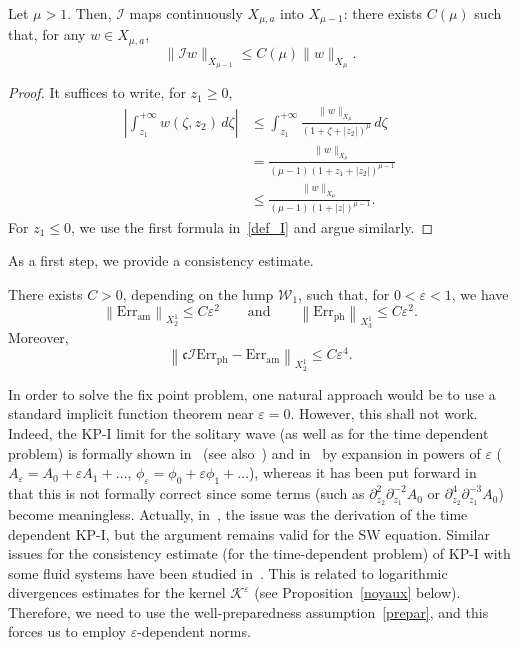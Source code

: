 \documentclass[AHL,Unicode,longabstracts,published]{cedram}
\newcommand*\p{\partial}
\newcommand{\amm}{\mathrm{am}}
\newcommand{\phl}{\mathrm{ph}}
\newcommand{\Err}{\mathrm{Err}}
\newcommand*\BI{\mathcal{I}}
\newcommand*\BK{\mathcal{K}}
\newcommand*\BW{\mathcal{W}}
\newcommand*\cs{{\mathfrak c}}
\newcommand*\ii{\infty}
\newcommand*\gs{\geqslant }
\newcommand*\ls{\leqslant }
\newcommand*\e{\varepsilon}
\begin{document}
\begin{prop}\label{primit}
Let $ \mu > 1 $. Then, $ \BI $ maps continuously $ X_{\mu,a} $ into $ X_{\mu -1 } $: there exists $ C(\mu) $ such that, for any $ w \in X_{\mu,a} $,
\[
\| \BI w \|_{X_{\mu-1}} \ls C(\mu) \| w \|_{X_{\mu}}.
\]
\end{prop}

\begin{proof}
It suffices to write, for $ z_1 \gs 0 $,
\begin{align*}
\left\lvert \int_{z_1}^{+\ii} w (\zeta, z_2) \, d\zeta \right\rvert & \ls \int_{z_1}^{+\ii} \frac{ \| w\|_{X_\mu} }{ (1 + \zeta + | z_2|)^\mu } \, d\zeta
\\ & = \frac{\| w\|_{X_\mu} }{ (\mu-1) (1 + z_1 + | z_2|)^{\mu-1} }
\\ &
\ls \frac{\| w\|_{X_\mu} }{ (\mu-1) (1 + | z|)^{\mu-1} }.
\end{align*}
For $z_1 \ls 0 $, we use the first formula in~\eqref{def_I} and argue similarly.
\end{proof}


As a first step, we provide a consistency estimate.
\begin{prop}\label{consistance}
There exists $ C > 0 $, depending on the lump $ \BW_1 $, such that, for $ 0 < \e <1 $, we have
\[
\left\| {\Err}_{\amm} \right\|_{X^1_2} \ls C \e^2
\qquad  \text{and} \qquad
\left\| {\Err}_{\phl} \right\|_{X^1_3} \ls C \e^2.
\]
Moreover,
\[
\left\| \cs \BI {\Err}_{\phl} - {\Err}_{\amm} \right\|_{X^1_2} \ls C \e^4.
\]
\end{prop}



In order to solve the fix point problem, one natural approach would be to use a standard implicit function theorem near $ \e = 0 $. However, this shall not work. Indeed, the KP-I limit for the solitary wave (as well as for the time dependent problem) is formally shown in~\cite{JR} (see also~\cite{BerRob:04}) and in~\cite{Kiv-Pel} by expansion in powers of $ \e $ ($ A_\e = A_0 + \e A_1 + \dotsc $, $ \phi_\e = \phi_0 + \e \phi_1 + \dotsc $), whereas it has been put forward in~\cite[Section~1.3]{Cerror} that this is not formally correct since some terms (such as $ \p_{z_2}^2 \p_{z_1}^{-2} A_0 $ or $ \p_{z_2}^4 \p_{z_1}^{-3} A_0 $) become meaningless. Actually, in~\cite{Cerror}, the issue was the derivation of the time dependent KP-I, but the argument remains valid for the SW equation. Similar issues for the consistency estimate (for the time-dependent problem) of KP-I with some fluid systems have been studied in~\cite{Lan_KPconsist}. This is related to logarithmic divergences estimates for the kernel $ \BK^\e $ (see Proposition~\ref{noyaux} below). Therefore, we need to use the well-preparedness assumption~\eqref{prepar}, and this forces us to employ $ \e $-dependent norms.
\end{document}
